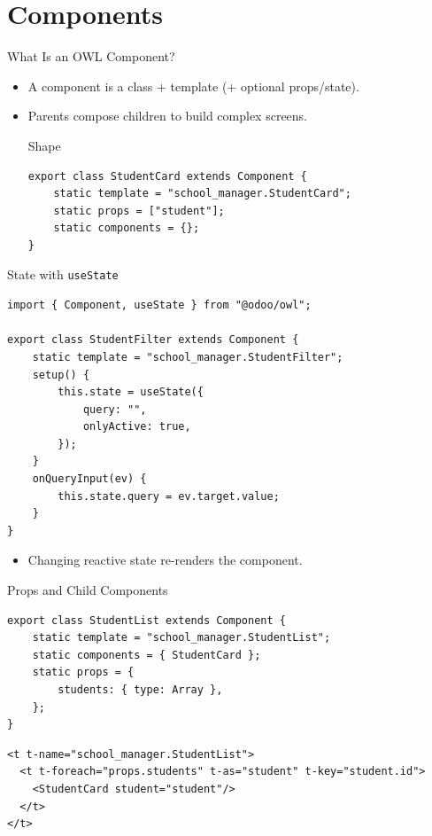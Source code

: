 \section{Components}

\begin{frame}[fragile]{What Is an OWL Component?}
	\begin{itemize}
		\item A component is a class + template (+ optional props/state).
		\item Parents compose children to build complex screens.
\begin{block}{Shape}
\begin{lstlisting}[style=js]
export class StudentCard extends Component {
	static template = "school_manager.StudentCard";
	static props = ["student"];
	static components = {};
}
\end{lstlisting}
\end{block}
	\end{itemize}
\end{frame}

\begin{frame}[fragile]{State with \texttt{useState}}
\begin{lstlisting}[style=js]
import { Component, useState } from "@odoo/owl";

export class StudentFilter extends Component {
	static template = "school_manager.StudentFilter";
	setup() {
		this.state = useState({
			query: "",
			onlyActive: true,
		});
	}
	onQueryInput(ev) {
		this.state.query = ev.target.value;
	}
}
\end{lstlisting}
	\begin{itemize}
		\item Changing reactive state re-renders the component.
	\end{itemize}
\end{frame}

\begin{frame}[fragile]{Props and Child Components}
\begin{lstlisting}[style=js]
export class StudentList extends Component {
	static template = "school_manager.StudentList";
	static components = { StudentCard };
	static props = {
		students: { type: Array },
	};
}
\end{lstlisting}
\begin{lstlisting}[style=xml]
<t t-name="school_manager.StudentList">
  <t t-foreach="props.students" t-as="student" t-key="student.id">
	<StudentCard student="student"/>
  </t>
</t>
\end{lstlisting}
\end{frame}

